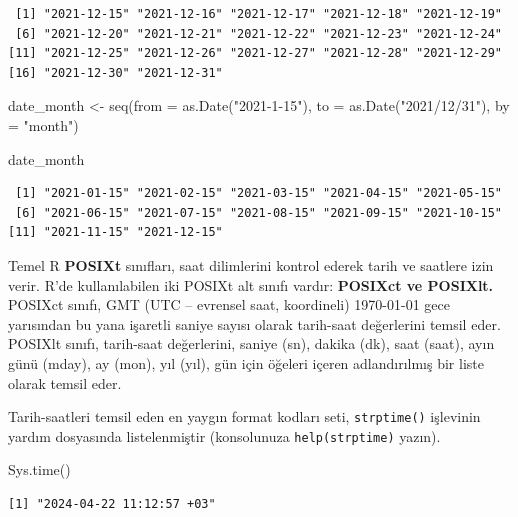 \documentclass[
  letterpaper,
  DIV=11,
  numbers=noendperiod]{scrreprt}
\newenvironment{Shaded}{\begin{snugshade}}{\end{snugshade}}
\newcommand{\AttributeTok}[1]{\textcolor[rgb]{0.40,0.45,0.13}{#1}}
\newcommand{\FunctionTok}[1]{\textcolor[rgb]{0.28,0.35,0.67}{#1}}
\newcommand{\NormalTok}[1]{\textcolor[rgb]{0.00,0.23,0.31}{#1}}
\newcommand{\OtherTok}[1]{\textcolor[rgb]{0.00,0.23,0.31}{#1}}
\newcommand{\StringTok}[1]{\textcolor[rgb]{0.13,0.47,0.30}{#1}}
\begin{document}
\begin{verbatim}
 [1] "2021-12-15" "2021-12-16" "2021-12-17" "2021-12-18" "2021-12-19"
 [6] "2021-12-20" "2021-12-21" "2021-12-22" "2021-12-23" "2021-12-24"
[11] "2021-12-25" "2021-12-26" "2021-12-27" "2021-12-28" "2021-12-29"
[16] "2021-12-30" "2021-12-31"
\end{verbatim}

\begin{Shaded}
\begin{Highlighting}[]
\NormalTok{date\_month }\OtherTok{\textless{}{-}} \FunctionTok{seq}\NormalTok{(}\AttributeTok{from =} \FunctionTok{as.Date}\NormalTok{(}\StringTok{"2021{-}1{-}15"}\NormalTok{), }
    \AttributeTok{to =} \FunctionTok{as.Date}\NormalTok{(}\StringTok{"2021/12/31"}\NormalTok{), }
    \AttributeTok{by =} \StringTok{"month"}\NormalTok{)}

\NormalTok{date\_month}
\end{Highlighting}
\end{Shaded}

\begin{verbatim}
 [1] "2021-01-15" "2021-02-15" "2021-03-15" "2021-04-15" "2021-05-15"
 [6] "2021-06-15" "2021-07-15" "2021-08-15" "2021-09-15" "2021-10-15"
[11] "2021-11-15" "2021-12-15"
\end{verbatim}

Temel R \textbf{POSIXt} sınıfları, saat dilimlerini kontrol ederek tarih
ve saatlere izin verir. R'de kullanılabilen iki POSIXt alt sınıfı
vardır: \textbf{POSIXct ve POSIXlt.} POSIXct sınıfı, GMT (UTC --
evrensel saat, koordineli) 1970-01-01 gece yarısından bu yana işaretli
saniye sayısı olarak tarih-saat değerlerini temsil eder. POSIXlt sınıfı,
tarih-saat değerlerini, saniye (sn), dakika (dk), saat (saat), ayın günü
(mday), ay (mon), yıl (yıl), gün için öğeleri içeren adlandırılmış bir
liste olarak temsil eder.

Tarih-saatleri temsil eden en yaygın format kodları seti,
\texttt{strptime()} işlevinin yardım dosyasında listelenmiştir
(konsolunuza \texttt{help(strptime)} yazın).

\begin{Shaded}
\begin{Highlighting}[]
\FunctionTok{Sys.time}\NormalTok{()}
\end{Highlighting}
\end{Shaded}

\begin{verbatim}
[1] "2024-04-22 11:12:57 +03"
\end{verbatim}
\end{document}
